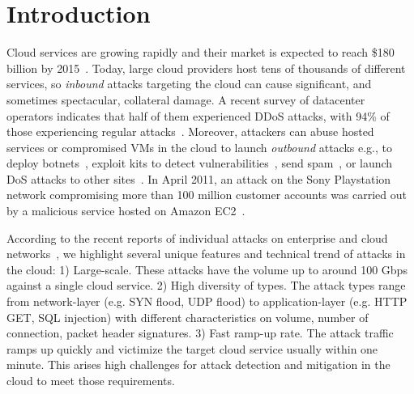\section{Introduction}
Cloud services are growing rapidly and their market is expected to reach \$180 billion by 2015~\cite{Gartner}.
%
Today, large cloud providers host tens of 
thousands of different services, so {\em inbound} attacks targeting the cloud can cause significant, and sometimes spectacular, collateral damage.
A recent survey of datacenter operators indicates that half of them
experienced DDoS attacks, with 94\% of those experiencing regular
attacks~\cite{arborworldwideinfrasecurityreport}. 
Moreover, attackers can abuse hosted services or compromised VMs in the
cloud to launch \emph{outbound} attacks
e.g., to deploy
botnets~\cite{googlesecurityreport}, exploit kits to detect
vulnerabilities~\cite{grier12manufacturing}, send
spam~\cite{kanich11show,tasterchoice}, or launch DoS attacks to other
sites~\cite{booth13cloud}.
In April 2011, an attack on the Sony Playstation network compromising
more than 100 million customer accounts was carried out by a malicious
service hosted on Amazon EC2~\cite{sonyattack}.

According to the recent reports of individual attacks on enterprise and cloud
 networks~\cite{googlesecurityreport,Prolexic}, we highlight several unique features and technical trend
 of attacks in the cloud:
 1) Large-scale. These attacks have 
 the volume up to around 100 Gbps against a single cloud service. 
 2) High diversity of types. The attack types range from network-layer (e.g. SYN flood, UDP flood) to
 application-layer (e.g. HTTP GET, SQL injection) with different characteristics on volume, number of connection, packet header signatures. 
 3) Fast ramp-up rate. The attack traffic ramps up quickly and victimize the target cloud service usually within one minute.
This arises high challenges for attack detection and mitigation in the cloud to meet those requirements.

